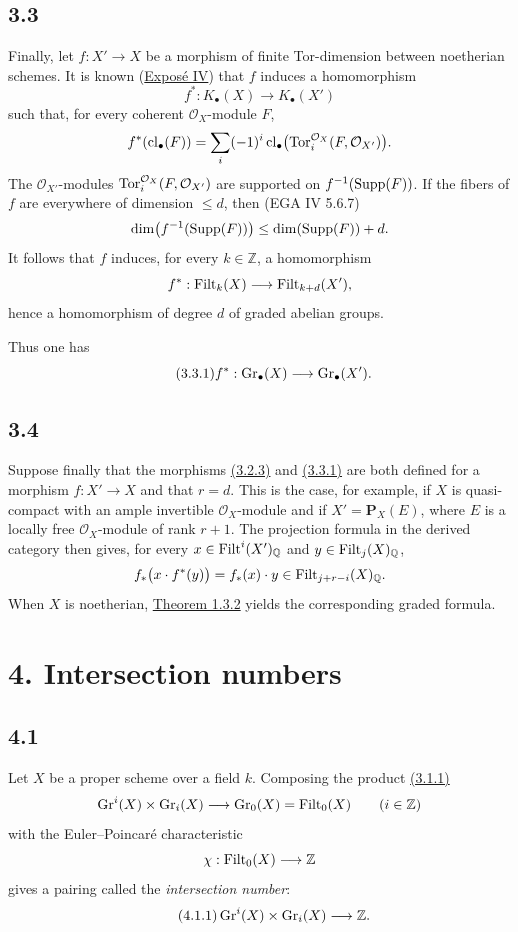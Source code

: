\subsection*{3.3}
Finally, let $f:X'\to X$ be a morphism of finite Tor-dimension between
noetherian schemes. It is known (\hyperlink{sga6.e04.expose}{Expos\'e IV}) that $f$ induces a homomorphism
\[
f^*:K_\bullet(X)\longrightarrow K_\bullet(X')
\]
such that, for every coherent $\mathcal O_X$-module $F$,
\[
f^*(\operatorname{cl}_\bullet(F))=
\sum_i(-1)^i\operatorname{cl}_\bullet\bigl(
\operatorname{Tor}_i^{\mathcal O_X}(F,\mathcal O_{X'})\bigr).
\]
The $\mathcal O_{X'}$-modules
$\operatorname{Tor}_i^{\mathcal O_X}(F,\mathcal O_{X'})$ are supported on
$f^{-1}(\operatorname{Supp}(F))$. If the fibers of $f$ are everywhere of dimension
$\leq d$, then (EGA IV 5.6.7)
\[
\dim\bigl(f^{-1}(\operatorname{Supp}(F))\bigr)\leq\dim(\operatorname{Supp}(F))+d.
\]
It follows that $f$ induces, for every $k\in\mathbb Z$, a homomorphism
\[
f^*:\operatorname{Filt}_k(X)\longrightarrow\operatorname{Filt}_{k+d}(X'),
\]
hence a homomorphism of degree $d$ of graded abelian groups.

Thus one has
\begin{equation}\tag{3.3.1}
f^*:\operatorname{Gr}_{\bullet}(X)\longrightarrow\operatorname{Gr}_{\bullet}(X').
\end{equation}

\subsection*{3.4}
Suppose finally that the morphisms \hyperlink{sga6.e10.eq.3-2-3}{(3.2.3)} and \hyperlink{sga6.e10.eq.3-3-1}{(3.3.1)} are both defined for a
morphism $f:X'\to X$ and that $r=d$. This is the case, for example, if $X$
is quasi-compact with an ample invertible $\mathcal O_X$-module and if
$X'=\mathbf P_X(E)$, where $E$ is a locally free $\mathcal O_X$-module of
rank $r+1$. The projection formula in the derived category then gives, for
every $x\in\operatorname{Filt}^i(X')_{\mathbb Q}$ and $y\in\operatorname{Filt}_j(X)_{\mathbb Q}$,
\[
f_*\bigl(x\cdot f^*(y)\bigr)=f_*(x)\cdot y
\in\operatorname{Filt}_{j+r-i}(X)_{\mathbb Q}.
\]
When $X$ is noetherian, \hyperlink{sga6.e10.thm.1-3-2}{Theorem 1.3.2} yields the corresponding graded formula.

\section*{4. Intersection numbers}

\subsection*{4.1}
Let $X$ be a proper scheme over a field $k$. Composing the product \hyperlink{sga6.e10.eq.3-1-1}{(3.1.1)}
\[
\operatorname{Gr}^i(X)\times\operatorname{Gr}_i(X)\longrightarrow\operatorname{Gr}_0(X)=\operatorname{Filt}_0(X)
\qquad(i\in\mathbb Z)
\]
with the Euler--Poincar\'e characteristic
\[
\chi:\operatorname{Filt}_0(X)\longrightarrow\mathbb Z
\]
gives a pairing called the \emph{intersection number}:
\begin{equation}\tag{4.1.1}
\operatorname{Gr}^i(X)\times\operatorname{Gr}_i(X)\longrightarrow\mathbb Z.
\end{equation}

